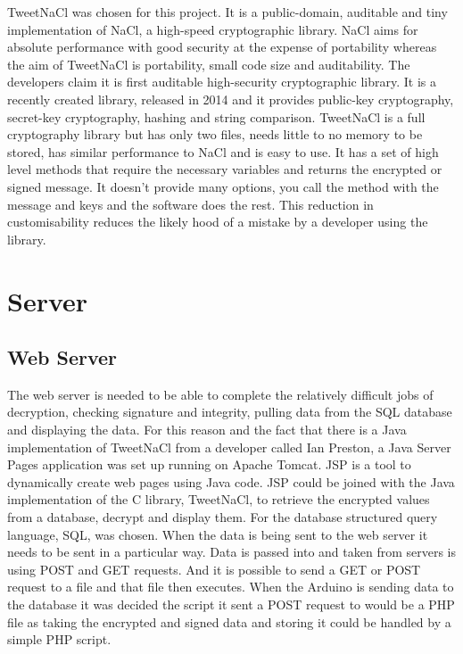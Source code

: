 
TweetNaCl was chosen for this project. It is a public-domain, auditable and tiny implementation of NaCl, a high-speed cryptographic library. NaCl aims for absolute performance with good security at the expense of portability whereas the aim of TweetNaCl is portability, small code size and auditability. The developers claim it is first auditable high-security cryptographic library. It is a recently created library, released in 2014 and it provides public-key cryptography, secret-key cryptography, hashing and string comparison. TweetNaCl is a full cryptography library but has only two files, needs little to no memory to be stored, has similar performance to NaCl and is easy to use. It has a set of high level methods that require the necessary variables and returns the encrypted or signed message. It doesn't provide many options, you call the method with the message and keys and the software does the rest. This reduction in customisability reduces the likely hood of a mistake by a developer using the library.


\section{Server}

\subsection{Web Server}

The web server is needed to be able to complete the relatively difficult jobs of decryption, checking signature and integrity, pulling data from the SQL database and displaying the data. For this reason and the fact that there is a Java implementation of TweetNaCl from a developer called Ian Preston, a Java Server Pages application was set up running on Apache Tomcat. JSP is a tool to dynamically create web pages using Java code. JSP could be joined with the Java implementation of the C library, TweetNaCl, to retrieve the encrypted values from a database, decrypt and display them. For the database structured query language, SQL, was chosen. When the data is being sent to the web server it needs to be sent in a particular way. Data is passed into and taken from servers is using POST and GET requests. And it is possible to send a GET or POST request to a file and that file then executes. When the Arduino is sending data to the database it was decided the script it sent a POST request to would be a PHP file as taking the encrypted and signed data and storing it could be handled by a simple PHP script.

